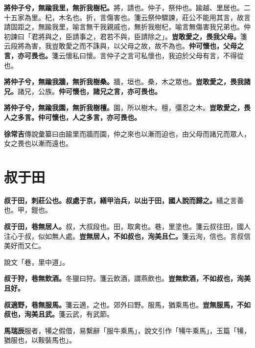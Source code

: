 \textbf{將仲子兮，無踰我里，無折我樹杞。}{\footnotesize 將，請也。仲子，祭仲也。踰越、里居也。二十五家為里。杞，木名也。折，言傷害也。箋云祭仲驟諫，莊公不能用其言，故言請固距之，無踰我里，喻言無干我親戚也，無折我樹杞，喻言無傷害我兄弟也。仲初諫曰「君將與之，臣請事之，君若不與，臣請除之」。}\textbf{豈敢愛之，畏我父母。}{\footnotesize 箋云段將為害，我豈敢愛之而不誅與，以父母之故，故不為也。}\textbf{仲可懷也，父母之言，亦可畏也。}{\footnotesize 箋云懷私曰懷。言仲子之言可私懷也，我迫於父母有言，不得從也。}

\textbf{將仲子兮，無踰我牆，無折我樹桑。}{\footnotesize 牆，垣也。桑，木之眾也。}\textbf{豈敢愛之，畏我諸兄。}{\footnotesize 諸兄，公族。}\textbf{仲可懷也，諸兄之言，亦可畏也。}

\textbf{將仲子兮，無踰我園，無折我樹檀。}{\footnotesize 園，所以樹木。檀，彊忍之木。}\textbf{豈敢愛之，畏人之多言。仲可懷也，人之多言，亦可畏也。}

\begin{quoting}\textbf{徐常吉}傳說彙纂曰由踰里而牆而園，仲之來也以漸而迫也，由父母而諸兄而眾人，女之畏也以漸而遠也。\end{quoting}

\section{叔于田}


\textbf{叔于田，刺莊公也。叔處于京，繕甲治兵，以出于田，國人說而歸之。}{\footnotesize 繕之言善也。甲，鎧也。}

\textbf{叔于田，巷無居人。}{\footnotesize 叔，大叔段也。田，取禽也。巷，里塗也。箋云叔往田，國人注心于叔，似如無人處。}\textbf{豈無居人，不如叔也，洵美且仁。}{\footnotesize 箋云洵，信也。言叔信美好而又仁。}

\begin{quoting}說文「巷，里中道」。\end{quoting}

\textbf{叔于狩，巷無飲酒。}{\footnotesize 冬獵曰狩。箋云飲酒，謂燕飲也。}\textbf{豈無飲酒，不如叔也，洵美且好。}

\textbf{叔適野，巷無服馬。}{\footnotesize 箋云適，之也。郊外曰野。服馬，猶乘馬也。}\textbf{豈無服馬，不如叔也，洵美且武。}{\footnotesize 箋云武，有武節。}

\begin{quoting}\textbf{馬瑞辰}服者，犕之假借，易繫辭「服牛乘馬」，說文引作「犕牛乘馬」，玉篇「犕，猶服也，以鞍裝馬也」。\end{quoting}

